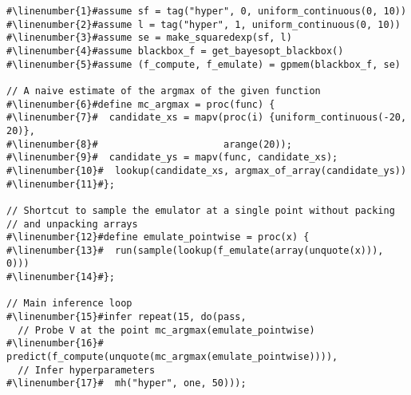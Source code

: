 \begin{mdframed}
\begin{minipage}{\linewidth}
\small
\belowcaptionskip=-10pt
\begin{lstlisting}[caption={Bayesian optimization using \gpmem},mathescape,numbers=none,label=alg:bayesopt,escapechar=\#]
#\linenumber{1}#assume sf = tag("hyper", 0, uniform_continuous(0, 10))
#\linenumber{2}#assume l = tag("hyper", 1, uniform_continuous(0, 10))
#\linenumber{3}#assume se = make_squaredexp(sf, l)
#\linenumber{4}#assume blackbox_f = get_bayesopt_blackbox()
#\linenumber{5}#assume (f_compute, f_emulate) = gpmem(blackbox_f, se)

// A naive estimate of the argmax of the given function
#\linenumber{6}#define mc_argmax = proc(func) {
#\linenumber{7}#  candidate_xs = mapv(proc(i) {uniform_continuous(-20, 20)},
#\linenumber{8}#                      arange(20));
#\linenumber{9}#  candidate_ys = mapv(func, candidate_xs);
#\linenumber{10}#  lookup(candidate_xs, argmax_of_array(candidate_ys))
#\linenumber{11}#};

// Shortcut to sample the emulator at a single point without packing
// and unpacking arrays
#\linenumber{12}#define emulate_pointwise = proc(x) {
#\linenumber{13}#  run(sample(lookup(f_emulate(array(unquote(x))), 0)))
#\linenumber{14}#};

// Main inference loop
#\linenumber{15}#infer repeat(15, do(pass,
  // Probe V at the point mc_argmax(emulate_pointwise)
#\linenumber{16}#  predict(f_compute(unquote(mc_argmax(emulate_pointwise)))),
  // Infer hyperparameters
#\linenumber{17}#  mh("hyper", one, 50)));
\end{lstlisting}

\end{minipage}
\end{mdframed}
